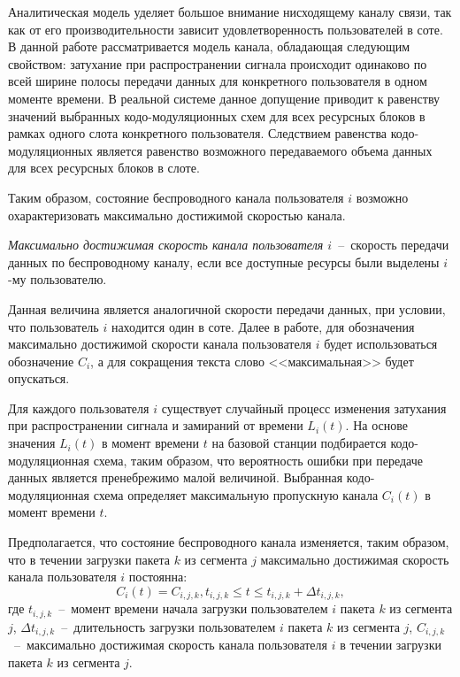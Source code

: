Аналитическая модель уделяет большое внимание нисходящему каналу связи, так как от его производительности зависит удовлетворенность пользователей в соте. В данной работе рассматривается модель канала, обладающая следующим свойством: затухание при распространении сигнала происходит одинаково по всей ширине полосы передачи данных для конкретного пользователя в одном моменте времени. В реальной системе данное допущение приводит к равенству значений выбранных кодо-модуляционных схем для всех ресурсных блоков в рамках одного слота конкретного пользователя. Следствием равенства кодо-модуляционных является равенство возможного передаваемого объема данных для всех ресурсных блоков в слоте.

Таким образом, состояние беспроводного канала пользователя $i$ возможно охарактеризовать максимально достижимой скоростью канала.
\begin{definition}
\label{def:MaxThroughput}
    \emph{Максимально достижимая скорость канала пользователя $i$}~--~скорость передачи данных по беспроводному каналу, если все доступные ресурсы были выделены $i$-му пользователю.
\end{definition}
Данная величина является аналогичной скорости передачи данных, при условии, что пользователь $i$ находится один в соте. Далее в работе, для обозначения максимально достижимой скорости канала пользователя $i$ будет использоваться обозначение $C_i$, а для сокращения текста слово <<максимальная>> будет опускаться.

Для каждого пользователя $i$ существует случайный процесс изменения затухания при распространении сигнала и замираний от времени $L_i(t)$. На основе значения $L_i(t)$ в момент времени $t$ на базовой станции подбирается кодо-модуляционная схема, таким образом, что вероятность ошибки при передаче данных является пренебрежимо малой величиной. Выбранная кодо-модуляционная схема определяет максимальную пропускную канала $C_i(t)$ в момент времени $t$.

Предполагается, что состояние беспроводного канала изменяется, таким образом, что в течении загрузки пакета $k$ из сегмента $j$ максимально достижимая скорость канала пользователя $i$ постоянна:
\begin{equation}
C_i(t)=C_{i,j,k}, t_{i,j,k} \leq t \leq t_{i,j,k}+\Delta t_{i,j,k},
\label{eq:ChannelConst}
\end{equation}
где $t_{i,j,k}$~--~момент времени начала загрузки пользователем $i$ пакета $k$ из сегмента $j$, $\Delta t_{i,j,k}$~--~длительность загрузки пользователем $i$ пакета $k$ из сегмента $j$, $C_{i,j,k}$~--~максимально достижимая скорость канала пользователя $i$ в течении загрузки пакета $k$ из сегмента $j$.

